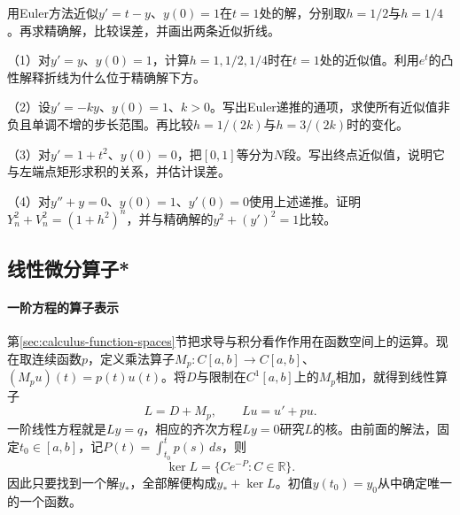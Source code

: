 \begin{example}
\label{ex:calculus-euler-values}
用Euler方法近似\(y'=t-y\)、\(y(0)=1\)在\(t=1\)处的解，分别取\(h=1/2\)与\(h=1/4\)。再求精确解，比较误差，并画出两条近似折线。
\end{example}

\begin{exercise}
\mbox{}\par\nobreak

（1）对\(y'=y\)、\(y(0)=1\)，计算\(h=1,1/2,1/4\)时在\(t=1\)处的近似值。利用\(e^t\)的凸性解释折线为什么位于精确解下方。

（2）设\(y'=-ky\)、\(y(0)=1\)、\(k>0\)。写出Euler递推的通项，求使所有近似值非负且单调不增的步长范围。再比较\(h=1/(2k)\)与\(h=3/(2k)\)时的变化。

（3）对\(y'=1+t^2\)、\(y(0)=0\)，把\([0,1]\)等分为\(N\)段。写出终点近似值，说明它与左端点矩形求积的关系，并估计误差。

（4）对\(y''+y=0\)、\(y(0)=1\)、\(y'(0)=0\)使用上述递推。证明\(Y_n^2+V_n^2=(1+h^2)^n\)，并与精确解的\(y^2+(y')^2=1\)比较。
\end{exercise}
\endgroup

\FloatBarrier
\newpage
\begingroup
\setlength{\parskip}{4pt}
\setlength{\abovedisplayskip}{10pt}
\setlength{\belowdisplayskip}{10pt}
\subsection{线性微分算子*}
\label{subsec:calculus-linear-differential-operators}

\paragraph{一阶方程的算子表示} \mbox{}

第\ref{sec:calculus-function-spaces}节把求导与积分看作作用在函数空间上的运算。现在取连续函数\(p\)，定义乘法算子\(M_p:C[a,b]\to C[a,b]\)、\((M_pu)(t)=p(t)u(t)\)。将\(D\)与限制在\(C^1[a,b]\)上的\(M_p\)相加，就得到线性算子
\begin{equation*}
 L=D+M_p,\qquad Lu=u'+pu.
\end{equation*}
一阶线性方程就是\(Ly=q\)，相应的齐次方程\(Ly=0\)研究\(L\)的核。由前面的解法，固定\(t_0\in[a,b]\)，记\(P(t)=\int_{t_0}^t p(s)\,ds\)，则
\begin{equation*}
 \ker L=\{Ce^{-P}:C\in\mathbb R\}.
\end{equation*}
因此只要找到一个解\(y_*\)，全部解便构成\(y_*+\ker L\)。初值\(y(t_0)=y_0\)从中确定唯一的一个函数。

